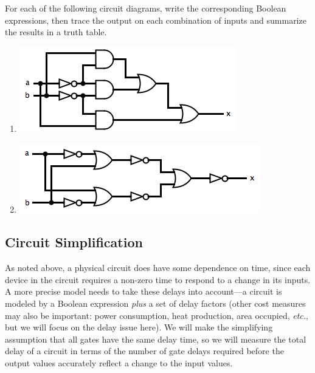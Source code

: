 \begin{exercises}
\problem For each of the following circuit diagrams, write the corresponding Boolean expressions, then trace the output on each combination of inputs and summarize the results in a truth table.
\begin{enumerate}
\item \includegraphics[width=!,height=!,scale=0.75]{graphics/Exercise5213a.png}
\item \includegraphics[width=!,height=!,scale=0.75]{graphics/Exercise5213b.png}
\end{enumerate}
\end{exercises}

\subsection{Circuit Simplification}\label{sec:circsimp}
As noted above, a physical circuit does have some dependence on time, since each device in the circuit requires a non-zero time to respond to a change in its inputs. A more precise model needs to take these delays into account---a circuit is modeled by a Boolean expression \emph{plus} a set of delay factors (other cost measures may also be important: power consumption, heat production, area occupied, \textit{etc.}, but we will focus on the delay issue here). We will make the simplifying assumption that all gates have the same delay time, so we will measure the total delay of a circuit in terms of the number of gate delays required before the output values accurately reflect a change to the input values.

